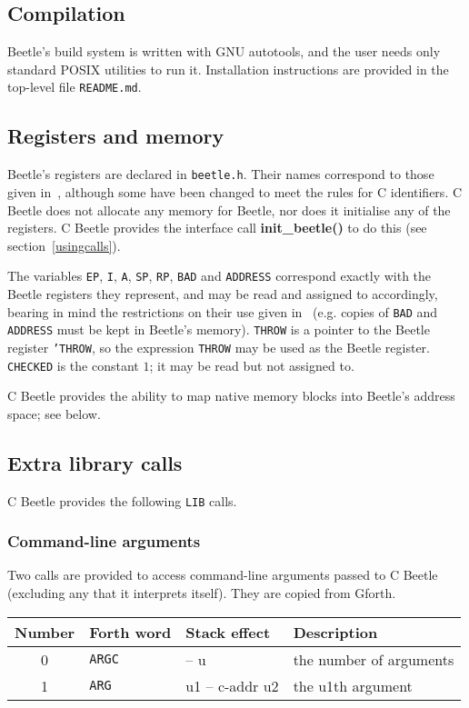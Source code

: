 \documentclass[english]{article}
\newcommand{\spic}[1]{{\spfont\setlength{\baselineskip}{\normalbaselineskip}#1\/}}
\begin{document}
\subsection{Compilation}

Beetle's build system is written with GNU autotools, and the user
needs only standard POSIX utilities to run it. Installation
instructions are provided in the top-level file {\tt README.md}.


\subsection{Registers and memory}

Beetle's registers are declared in {\tt beetle.h}. Their names correspond to
those given in~\cite[section~2.1]{beetle}, although some have been changed
to meet the rules for C identifiers. C Beetle does not allocate any
memory for Beetle, nor does it initialise any of the registers. C Beetle
provides the interface call {\bf init\_beetle()} to do this (see
section~\ref{usingcalls}).

The variables {\tt EP}, {\tt I}, {\tt A}, {\tt SP}, {\tt RP}, {\tt BAD} and {\tt ADDRESS}
correspond exactly with the Beetle registers they represent, and may be read
and assigned to accordingly, bearing in mind the restrictions on their use
given in~\cite{beetle} (e.g. copies of {\tt BAD} and {\tt ADDRESS} must be
kept in Beetle's memory). {\tt THROW} is a pointer to the Beetle register
{\tt 'THROW}, so the expression {\tt *THROW} may be used as the Beetle
register. {\tt CHECKED} is the constant $1$; it may be read but not
assigned to.

C Beetle provides the ability to map native memory blocks into Beetle’s address space; see below.


\subsection{Extra library calls}

C Beetle provides the following {\tt LIB} calls.

\subsubsection{Command-line arguments}

Two calls are provided to access command-line arguments passed to C Beetle (excluding any that it interprets itself). They are copied from Gforth.

\begin{center}
\begin{tabular}{S[table-format=2.0]lll} \toprule
\bf Number & \bf Forth word & \bf Stack effect & \bf Description \\  & {\tt ARGC} & \spic{-- u} & the number of arguments \\
1 & {\tt ARG} & \spic{u1 -- c-addr u2} & the \spic{u1}th argument \\ \bottomrule
\end{tabular}
\end{center}
\end{document}
